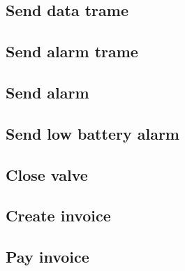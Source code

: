 \subsection{Send data trame}
\label{uc:send-data-trame}


\subsection{Send alarm trame}
\label{uc:send-alarm-trame}


\subsection{Send alarm}
\label{uc:send-alarm}


\subsection{Send low battery alarm}
\label{uc:send-low-battery-alarm}


\subsection{Close valve}
\label{uc:close-valve}


\subsection{Create invoice}
\label{uc:create-invoice}


\subsection{Pay invoice}
\label{uc:pay-invoice}


